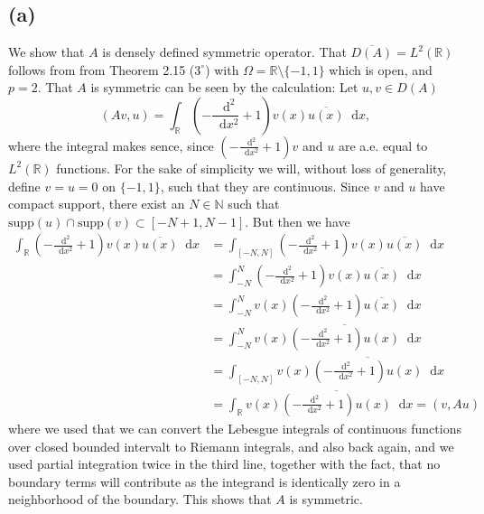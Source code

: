 \documentclass[a4paper,11pt]{article}
\newcommand{\supp}{\text{supp}}
\newcommand*\diff{\mathop{}\!\mathrm{d}}
\newcommand{\R}{\mathbb{R}}
\newcommand{\N}{\mathbb{N}}
\numberwithin{equation}{section}
\begin{document}
\subsection*{(a)} 
We show that $ A $ is densely defined symmetric operator.
That $ \overline{D(A)}=L^2(\R) $ follows from from Theorem 2.15 ($ 3^\circ $) with $ \Omega=\R\setminus\{-1,1\} $ which is open, and $ p=2 $. That $ A $ is symmetric can be seen by the calculation: Let $ u,v\in D(A) $\begin{equation}
(Av,u)=\int_{\R} \left(-\frac{\diff^2}{\diff x^2}+1\right)v(x)\overline{u(x)} \diff x,
\end{equation}
where the integral makes sence, since $ \left(-\frac{\diff^2}{\diff x^2}+1\right)v $ and $ u $ are a.e. equal to $ L^2(\R) $ functions. For the sake of simplicity we will, without loss of generality, define $ v=u=0 $ on $ \{-1,1\} $, such that they are continuous. Since $ v $ and $ u $ have compact support, there exist an $ N\in \N $ such that $ \supp(u)\cap \supp(v)\subset [-N+1,N-1] $. But then we have \begin{equation}
\begin{aligned}
\int_{\R} \left(-\frac{\diff^2}{\diff x^2}+1\right)v(x)\overline{u(x)} \diff x&=\int_{[-N,N]} \left(-\frac{\diff^2}{\diff x^2}+1\right)v(x)\overline{u(x)}\diff x\\
&=\int_{-N}^{N}\left(-\frac{\diff^2}{\diff x^2}+1\right)v(x)\overline{u(x)} \diff x\\
&=\int_{-N}^{N}v(x)\left(-\frac{\diff^2}{\diff x^2}+1\right)\overline{u(x)} \diff x\\
&=\int_{-N}^{N}v(x)\overline{\left(-\frac{\diff^2}{\diff x^2}+1\right)u(x)} \diff x\\
&=\int_{[-N,N]}v(x)\overline{\left(-\frac{\diff^2}{\diff x^2}+1\right)u(x)} \diff x\\
&=\int_{\R}v(x)\overline{\left(-\frac{\diff^2}{\diff x^2}+1\right)u(x)} \diff x=(v,Au)
\end{aligned}
\end{equation}
where we used that we can convert the Lebesgue integrals of continuous functions over closed bounded intervalt to Riemann integrals, and also back again, and we used partial integration twice in the third line, together with the fact, that no boundary terms will contribute as the integrand is identically zero in a neighborhood of the boundary. This shows that $ A $ is symmetric.
\end{document}

